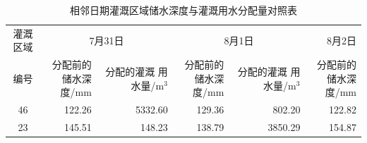 \begin{table}[H]
 \centering\small
 \caption{相邻日期灌溉区域储水深度与灌溉用水分配量对照表}
 \label{tab:irrigation89-regional-continuity}
 \setlength{\tabcolsep}{4pt}
 \renewcommand{\arraystretch}{1.15}
 \begin{tabular}{crrrrr}
 \toprule
 灌溉区域 & \multicolumn{2}{c}{7月31日} & \multicolumn{2}{c}{8月1日} & 8月2日\\
 \cmidrule(lr){2-3}\cmidrule(lr){4-5}\cmidrule(lr){6-6}
 编号 & \shortstack{分配前的\\储水深度/mm} & \shortstack{分配的灌溉\\用水量/m$^3$} & \shortstack{分配前的\\储水深度/mm} & \shortstack{分配的灌溉\\用水量/m$^3$} & \shortstack{分配前的\\储水深度/mm}\\
 \midrule
 46 & 122.26 & 5332.60 & 129.36 & 802.20 & 122.82\\
 23 & 145.51 & 148.23 & 138.79 & 3850.29 & 154.87\\
 \bottomrule
 \end{tabular}
\end{table}
